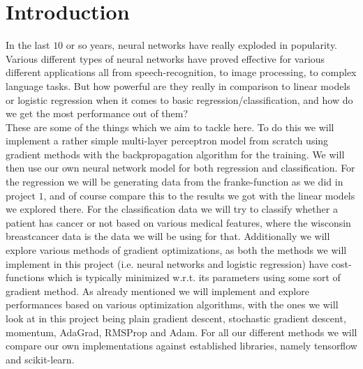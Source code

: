 \documentclass{article}
\begin{document}
\section{Introduction}
In the last $10$ or so years, neural networks have really exploded in
popularity. Various different types of neural networks have proved effective for
various different applications all from speech-recognition, to image processing,
to complex language tasks. But how powerful are they really in comparison to
linear models or logistic regression when it comes to basic
regression/classification, and how do we get the most performance out of them?
\\

These are some of the things which we aim to tackle here. To do this we will
implement a rather simple multi-layer perceptron model from scratch using
gradient methods with the backpropagation algorithm for the training. We will
then use our own neural network model for both regression and classification.
For the regression we will be generating data from the franke-function as we did
in project $1$, and of course compare this to the results we got with the linear
models we explored there. For the classification data we will try to classify
whether a patient has cancer or not based on various medical features, where the
wisconsin breastcancer data \cite{breastcancerwisconsin} is the data we will be
using for that.  Additionally we will explore various methods of gradient
optimizations, as both the methods we will implement in this project (i.e.
neural networks and logistic regression) have cost-functions which is typically
minimized w.r.t. its parameters using some sort of gradient method.  As already
mentioned we will implement and explore performances based on various
optimization algorithms, with the ones we will look at in this project being
plain gradient descent, stochastic gradient descent, momentum, AdaGrad, RMSProp
and Adam.  For all our different methods we will compare our own implementations
against established libraries, namely tensorflow and scikit-learn.
\end{document}
